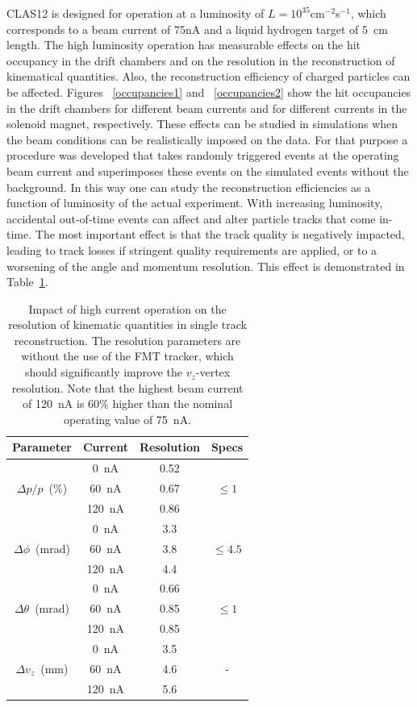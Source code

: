 \documentclass[final,3p,twocolumn]{elsarticle}
\begin{document}
CLAS12 is designed for operation at a luminosity of $L = 10^{35}$cm$^{-2}$s$^{-1}$, which corresponds to a 
beam current of 75nA and a liquid hydrogen target of 5~cm length. The high luminosity
operation has measurable effects on the hit occupancy in the drift chambers and on the resolution in the reconstruction of kinematical quantities. Also, the reconstruction efficiency of charged particles can be affected. Figures ~\ref{occupancies1}
and ~\ref{occupancies2} show the hit occupancies in the drift chambers for different beam currents and for different
currents in the solenoid magnet, respectively. These effects can be studied in simulations when the beam conditions can
be realistically imposed on the data. For that purpose a procedure was developed that takes randomly triggered events
at the operating beam current and superimposes these events on the simulated events without the background. In this
way one can study the reconstruction efficiencies as a function of luminosity of the actual experiment. With increasing
luminosity, accidental out-of-time events can affect and alter particle tracks that come in-time. The most important
effect is that the track quality is negatively impacted, leading to track losses if stringent quality requirements are
applied, or to a worsening of the angle and momentum resolution. This effect is demonstrated in Table~\ref{resolution}.   


\begin{table}[htbp!]
\caption{Impact of high current operation on the resolution of kinematic quantities in single track reconstruction.
The resolution parameters are without the use of the FMT tracker, which should significantly improve the $v_z$-vertex 
resolution.
  Note that the highest beam current of 120~nA is 60\% higher than the nominal operating value of 75~nA.}     
\begin{center}
\begin{tabular}{c|c|c|c} \hline
  Parameter & Current & Resolution &Specs \\ \hline
  & 0~nA  & 0.52 & \\
$\Delta{p}/p$~(\%) &60~nA &  0.67& $\le 1$\\
& 120~nA &  0.86 &  \\ \hline 
&0~nA &  3.3 &  \\
$\Delta \phi$~(mrad)& 60~nA &  3.8 &  $\le 4.5$\\
&120~nA  & 4.4 &  \\ \hline
&0~nA &  0.66 &  \\
$\Delta \theta$~(mrad)& 60~nA &  0.85 &  $\le 1$\\
&120~nA  & 0.85 &  \\ \hline
& 0~nA & 3.5 &  \\
$\Delta{v_z}$~(mm) & 60~nA & 4.6 & -  \\
& 120~nA & 5.6 & \\ \hline
\end{tabular}

\label{resolution}
\end{center}
\end{table}
\end{document}
